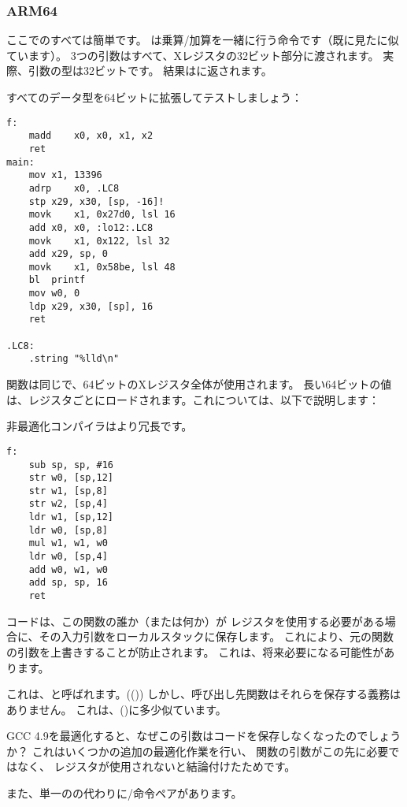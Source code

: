 \subsubsection{ARM64}


ここでのすべては簡単です。 
は乗算/加算を一緒に行う命令です（既に見たに似ています）。 
3つの引数はすべて、Xレジスタの32ビット部分に渡されます。 
実際、引数の型は32ビットです。 結果はに返されます。



すべてのデータ型を64ビットに拡張してテストしましょう：



\begin{lstlisting}[style=customasmARM]
f:
	madd	x0, x0, x1, x2
	ret
main:
	mov	x1, 13396
	adrp	x0, .LC8
	stp	x29, x30, [sp, -16]!
	movk	x1, 0x27d0, lsl 16
	add	x0, x0, :lo12:.LC8
	movk	x1, 0x122, lsl 32
	add	x29, sp, 0
	movk	x1, 0x58be, lsl 48
	bl	printf
	mov	w0, 0
	ldp	x29, x30, [sp], 16
	ret

.LC8:
	.string	"%lld\n"
\end{lstlisting}

\ttf 関数は同じで、64ビットのXレジスタ全体が使用されます。 
長い64ビットの値は、レジスタごとにロードされます。これについては、以下で説明します：


非最適化コンパイラはより冗長です。

\begin{lstlisting}[style=customasmARM]
f:
	sub	sp, sp, #16
	str	w0, [sp,12]
	str	w1, [sp,8]
	str	w2, [sp,4]
	ldr	w1, [sp,12]
	ldr	w0, [sp,8]
	mul	w1, w1, w0
	ldr	w0, [sp,4]
	add	w0, w1, w0
	add	sp, sp, 16
	ret
\end{lstlisting}

コードは、この関数の誰か（または何か）が
レジスタを使用する必要がある場合に、その入力引数をローカルスタックに保存します。 
これにより、元の関数の引数を上書きすることが防止されます。
これは、将来必要になる可能性があります。

これは、と呼ばれます。((\ARMPCS))
しかし、呼び出し先関数はそれらを保存する義務はありません。 
これは、()に多少似ています。

GCC 4.9を最適化すると、なぜこの引数はコードを保存しなくなったのでしょうか？ 
これはいくつかの追加の最適化作業を行い、
関数の引数がこの先に必要ではなく、
レジスタが使用されないと結論付けたためです。


また、単一のの代わりに/命令ペアがあります。
